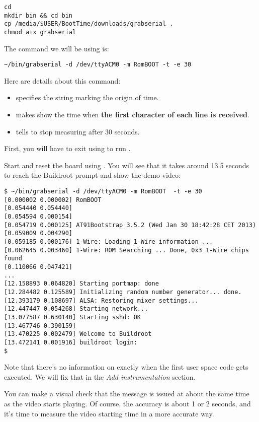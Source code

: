 \begin{verbatim}
cd
mkdir bin && cd bin
cp /media/$USER/BootTime/downloads/grabserial .
chmod a+x grabserial
\end{verbatim}

The command we will be using is:

\begin{verbatim}
~/bin/grabserial -d /dev/ttyACM0 -m RomBOOT -t -e 30
\end{verbatim}

Here are details about this command:

\begin{itemize}
\item {} specifies the string marking the
origin of time.
\item {} makes  show the time when
{\bf the first character of each line is received}.
\item {} tells  to stop measuring after 30
seconds.
\end{itemize}

First, you will have to exit  using  to run
.

Start  and reset the board using . You will
see that it takes around 13.5 seconds to reach the Buildroot prompt and
show the demo video:

\begin{verbatim}
$ ~/bin/grabserial -d /dev/ttyACM0 -m RomBOOT  -t -e 30
[0.000002 0.000002] RomBOOT
[0.054440 0.054440]
[0.054594 0.000154]
[0.054719 0.000125] AT91Bootstrap 3.5.2 (Wed Jan 30 18:42:28 CET 2013)
[0.059009 0.004290]
[0.059185 0.000176] 1-Wire: Loading 1-Wire information ...
[0.062645 0.003460] 1-Wire: ROM Searching ... Done, 0x3 1-Wire chips
found
[0.110066 0.047421]
...
[12.158893 0.064820] Starting portmap: done
[12.284482 0.125589] Initializing random number generator... done.
[12.393179 0.108697] ALSA: Restoring mixer settings...
[12.447447 0.054268] Starting network...
[13.077587 0.630140] Starting sshd: OK
[13.467746 0.390159]
[13.470225 0.002479] Welcome to Buildroot
[13.472141 0.001916] buildroot login:
$
\end{verbatim}

Note that there's no information on exactly when the first user space
code gets executed. We will fix that in the {\em Add instrumentation}
section.

You can make a visual check that the  message is issued at about the same time as the video
starts playing. Of course, the accuracy is about 1 or 2 seconds,
and it's time to measure the video starting time in a more accurate way.


